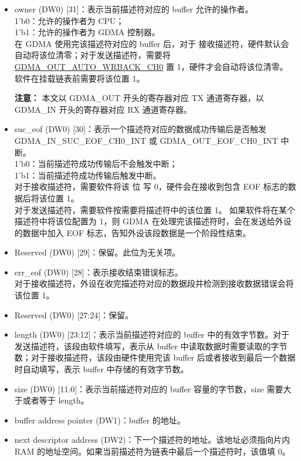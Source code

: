 \documentclass[main\_\_CN.tex]{subfiles}
\begin{document}
\begin{itemize}
    \item owner (DW0) [31]：表示当前描述符对应的 buffer 允许的操作者。\\
    1'b0：允许的操作者为 CPU；\\
    1'b1：允许的操作者为 GDMA 控制器。\\
    在 GDMA 使用完该描述符对应的 buffer 后，对于 接收描述符，硬件默认会自动将该位清零；对于发送描述符，需要将 \hyperref[fielddesc:GDMAOUTAUTOWRBACKCH0]{GDMA\_OUT\_AUTO\_WRBACK\_CH0} 置 1，硬件才会自动将该位清零。 软件在挂载链表前需要将该位置 1。

    {\bfseries 注意：} 本文以 GDMA\_OUT 开头的寄存器对应 TX 通道寄存器，以 GDMA\_IN 开头的寄存器对应 RX 通道寄存器。
    \item suc\_eof (DW0) [30]：表示一个描述符对应的数据成功传输后是否触发 GDMA\_IN\_SUC\_EOF\_CH0\_INT 或 GDMA\_OUT\_EOF\_CH0\_INT 中断。\\
    1'b0：当前描述符成功传输后不会触发中断；\\
    1'b1：当前描述符成功传输后触发中断。\\
    对于接收描述符，需要软件将该 位 写 0，硬件会在接收到包含 EOF 标志的数据后将该位置 1。\\对于发送描述符，需要软件按需要将描述符中的该位置 1。
    如果软件将在某个描述符中将该位配置为 1，则 GDMA 在处理完该描述符时，会在发送给外设的数据中加入 EOF 标志，告知外设该段数据是一个阶段性结束。
    \item Reserved (DW0) [29]：保留。此位为无关项。
    \item err\_eof (DW0) [28]：表示接收结束错误标志。\\
    对于接收描述符，外设在收完描述符对应的数据段并检测到接收数据错误会将该位置 1。
    \item Reserved (DW0) [27:24]：保留。
    \item length (DW0) [23:12]：表示当前描述符对应的 buffer 中的有效字节数。对于发送描述符，该段由软件填写，表示从 buffer 中读取数据时需要读取的字节数；对于接收描述符，该段由硬件使用完该 buffer 后或者接收到最后一个数据时自动填写，表示 buffer 中存储的有效字节数。
    \item size (DW0) [11:0]：表示当前描述符对应的 buffer 容量的字节数，size 需要大于或者等于 length。
    \item buffer address pointer (DW1)：buffer 的地址。
    \item next descriptor address (DW2)：下一个描述符的地址。该地址必须指向片内 RAM 的地址空间。如果当前描述符为链表中最后一个描述符时，该值填 0。
\end{itemize}
\end{document}
